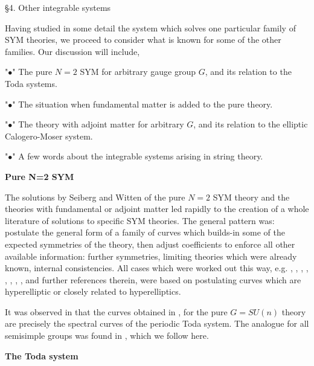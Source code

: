 \head \S4.  Other integrable systems
\endhead

Having studied in some detail the system 
which solves one particular
family of SYM theories, we proceed to 
consider what is known for 
some of the other families.  Our 
discussion will include,

\roster
\item"{$\bullet$}"  The pure $N=2$ 
SYM for arbitrary gauge group 
$G$, and its relation to the Toda systems.

\item"{$\bullet$}"  The situation 
when fundamental matter is 
added to the pure theory.

\item"{$\bullet$}"  The theory with 
adjoint matter for arbitrary
$G$, and its relation to the elliptic 
Calogero-Moser system.

\item"{$\bullet$}"  A few words about 
the integrable systems arising in string theory.
\endroster

\medskip\noindent
{\bf Pure N=2 SYM}

The solutions by Seiberg and Witten of the pure $N=2$ SYM theory
\cite{SW1} and the theories with fundamental or adjoint matter
\cite{SW2} led rapidly to the creation of a whole literature of
solutions to specific SYM theories.  The general pattern was: 
postulate the general form of a family of curves which 
builds-in some
of the expected symmetries of the theory, then adjust 
coefficients to 
enforce all other available information:  further 
symmetries, limiting theories
which were already known, internal consistencies.  
All cases which were 
worked out this way, e.g. \cite{KLTY}, \cite{AF}, \cite{DS},
\cite{HO}, \cite{APS}, \cite{BL}, \cite{AS}, 
\cite{H}, \cite{AAG} and
further references therein, were based 
on postulating curves which are
hyperelliptic or closely related to hyperelliptics.

It was observed in \cite{GKMMM} that 
the curves obtained in
\cite{KLTY}, \cite{AF} for the pure 
$G = SU(n)$ theory are precisely the
spectral curves of the periodic Toda 
system.  The analogue for all semisimple
groups was found in \cite{MW}, which we follow here.

\medskip\noindent
{\bf The Toda system}

